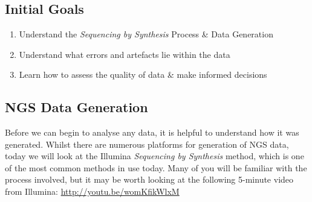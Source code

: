
\chapter{\moduleTitle}
\newpage

\section{Initial Goals}

\begin{enumerate}
\item Understand the \textit{Sequencing by Synthesis} Process \& Data Generation \\
\item Understand what errors and artefacts lie within the data \\
\item Learn how to assess the quality of data \& make informed decisions \\
\end{enumerate}

\section{NGS Data Generation}
\begin{steps}
Before we can begin to analyse any data, it is helpful to understand how it was generated.
Whilst there are numerous platforms for generation of NGS data, today we will look at the Illumina \textit{Sequencing by Synthesis} method, which is one of the most common methods in use today.
Many of you will be familiar with the process involved, but it may be worth looking at the following 5-minute video from Illumina: \url{http://youtu.be/womKfikWlxM} 
\end{steps}

